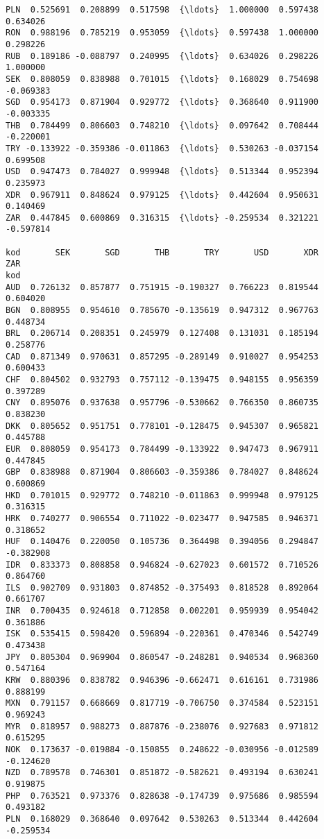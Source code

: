 \documentclass[11pt]{article}
\begin{document}
\begin{tcolorbox}[breakable, size=fbox, boxrule=.5pt, pad at break*=1mm, opacityfill=0]
\begin{Verbatim}[commandchars=\\\{\}]
PLN  0.525691  0.208899  0.517598  {\ldots}  1.000000  0.597438  0.634026
RON  0.988196  0.785219  0.953059  {\ldots}  0.597438  1.000000  0.298226
RUB  0.189186 -0.088797  0.240995  {\ldots}  0.634026  0.298226  1.000000
SEK  0.808059  0.838988  0.701015  {\ldots}  0.168029  0.754698 -0.069383
SGD  0.954173  0.871904  0.929772  {\ldots}  0.368640  0.911900 -0.003335
THB  0.784499  0.806603  0.748210  {\ldots}  0.097642  0.708444 -0.220001
TRY -0.133922 -0.359386 -0.011863  {\ldots}  0.530263 -0.037154  0.699508
USD  0.947473  0.784027  0.999948  {\ldots}  0.513344  0.952394  0.235973
XDR  0.967911  0.848624  0.979125  {\ldots}  0.442604  0.950631  0.140469
ZAR  0.447845  0.600869  0.316315  {\ldots} -0.259534  0.321221 -0.597814

kod       SEK       SGD       THB       TRY       USD       XDR       ZAR
kod
AUD  0.726132  0.857877  0.751915 -0.190327  0.766223  0.819544  0.604020
BGN  0.808955  0.954610  0.785670 -0.135619  0.947312  0.967763  0.448734
BRL  0.206714  0.208351  0.245979  0.127408  0.131031  0.185194  0.258776
CAD  0.871349  0.970631  0.857295 -0.289149  0.910027  0.954253  0.600433
CHF  0.804502  0.932793  0.757112 -0.139475  0.948155  0.956359  0.397289
CNY  0.895076  0.937638  0.957796 -0.530662  0.766350  0.860735  0.838230
DKK  0.805652  0.951751  0.778101 -0.128475  0.945307  0.965821  0.445788
EUR  0.808059  0.954173  0.784499 -0.133922  0.947473  0.967911  0.447845
GBP  0.838988  0.871904  0.806603 -0.359386  0.784027  0.848624  0.600869
HKD  0.701015  0.929772  0.748210 -0.011863  0.999948  0.979125  0.316315
HRK  0.740277  0.906554  0.711022 -0.023477  0.947585  0.946371  0.318652
HUF  0.140476  0.220050  0.105736  0.364498  0.394056  0.294847 -0.382908
IDR  0.833373  0.808858  0.946824 -0.627023  0.601572  0.710526  0.864760
ILS  0.902709  0.931803  0.874852 -0.375493  0.818528  0.892064  0.661707
INR  0.700435  0.924618  0.712858  0.002201  0.959939  0.954042  0.361886
ISK  0.535415  0.598420  0.596894 -0.220361  0.470346  0.542749  0.473438
JPY  0.805304  0.969904  0.860547 -0.248281  0.940534  0.968360  0.547164
KRW  0.880396  0.838782  0.946396 -0.662471  0.616161  0.731986  0.888199
MXN  0.791157  0.668669  0.817719 -0.706750  0.374584  0.523151  0.969243
MYR  0.818957  0.988273  0.887876 -0.238076  0.927683  0.971812  0.615295
NOK  0.173637 -0.019884 -0.150855  0.248622 -0.030956 -0.012589 -0.124620
NZD  0.789578  0.746301  0.851872 -0.582621  0.493194  0.630241  0.919875
PHP  0.763521  0.973376  0.828638 -0.174739  0.975686  0.985594  0.493182
PLN  0.168029  0.368640  0.097642  0.530263  0.513344  0.442604 -0.259534

\end{Verbatim}
\end{tcolorbox}
\end{document}
